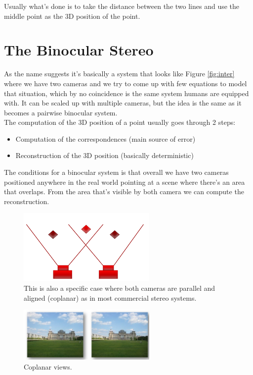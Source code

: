 Usually what's done is to take the distance between the two lines and use the middle point as the 3D position of the point. 

\section{The Binocular Stereo}

As the name suggests it's basically a system that looks like Figure \ref{fig:inter} where we have two cameras and we try to come up with few equations to model that situation, which by no coincidence is the same system humans are equipped with. It can be scaled up with multiple cameras, but the idea is the same as it becomes a pairwise binocular system. 
\\The computation of the 3D position of a point usually goes through 2 steps:
\begin{itemize}
    \item Computation of the correspondences (main source of error) 
    \item Reconstruction of the 3D position (basically deterministic)
\end{itemize}

The conditions for a binocular system is that overall we have two cameras positioned anywhere in the real world pointing at a scene where there's an area that overlaps. From the area that's visible by both camera we can compute the reconstruction.

\begin{figure}[H]
    \centering
    \includegraphics[width=0.6\textwidth]{Figures/binoc.png}
    \caption{This is also a specific case where both cameras are parallel and aligned (coplanar) as in most commercial stereo systems.}
    \label{fig:binoc}
\end{figure}




\begin{figure}[h!]
    \centering
    \includegraphics[width=0.6\textwidth]{Figures/coplan.png}
    \caption{Coplanar views.}
    \label{fig:coplan}
\end{figure}

